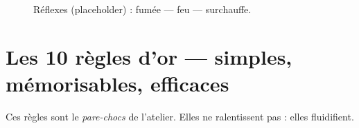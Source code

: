 \documentclass[../../main.tex]{subfiles}
\begin{document}
\begin{figure}[!h]
  \centering
  \fbox{\rule{0pt}{0.26\textheight}\rule{0.9\textwidth}{0pt}}
  \caption{Réflexes (placeholder) : fumée — feu — surchauffe.}
\end{figure}

\section{Les 10 règles d’or — simples, mémorisables, efficaces}

Ces règles sont le \textit{pare-chocs} de l’atelier. Elles ne ralentissent pas : elles fluidifient.
\end{document}
